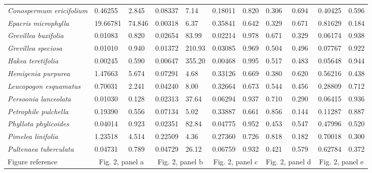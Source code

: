 \documentclass[10pt,twoside]{article}\usepackage[]{graphicx}\usepackage[]{color}
\begin{document}
\begin{table}[h]
{\begin{tabular}{p{3cm}|p{1cm}p{1cm}|p{1cm}p{1cm}|p{1cm}p{1cm}|p{1cm}p{1cm}|p{1.5cm}p{1cm}}
  \textit{Conospermum ericifolium} &  0.46255 &  2.845 & 0.08337 &   7.14 & 0.18011 & 0.820 & 0.306 & 0.694 & 0.40425 & 0.596 \\ 
  \textit{Epacris microphylla} & 19.66781 & 74.846 & 0.00318 &   6.37 & 0.35841 & 0.642 & 0.329 & 0.671 & 0.81629 & 0.184 \\ 
  \textit{Grevillea buxifolia} &  0.01083 &  0.820 & 0.02654 &  83.99 & 0.02214 & 0.978 & 0.671 & 0.329 & 0.06174 & 0.938 \\ 
  \textit{Grevillea speciosa} &  0.01010 &  0.940 & 0.01372 & 210.93 & 0.03085 & 0.969 & 0.504 & 0.496 & 0.07767 & 0.922 \\ 
  \textit{Hakea teretifolia} &  0.00245 &  0.590 & 0.00647 & 355.20 & 0.00468 & 0.995 & 0.517 & 0.483 & 0.05648 & 0.944 \\ 
  \textit{Hemigenia purpurea} &  1.47663 &  5.674 & 0.07291 &   4.68 & 0.33126 & 0.669 & 0.380 & 0.620 & 0.56216 & 0.438 \\ 
  \textit{Leucopogon esquamatus} &  0.70031 &  2.241 & 0.04240 &   8.00 & 0.32664 & 0.673 & 0.544 & 0.456 & 0.28809 & 0.712 \\ 
  \textit{Persoonia lanceolata} &  0.01030 &  0.128 & 0.02313 &  37.64 & 0.06294 & 0.937 & 0.710 & 0.290 & 0.06415 & 0.936 \\ 
  \textit{Petrophile pulchella} &  0.19390 &  0.556 & 0.07134 &   5.02 & 0.33887 & 0.661 & 0.856 & 0.144 & 0.11287 & 0.887 \\ 
  \textit{Phyllota phylicoides} &  0.04014 &  0.923 & 0.02351 &  82.84 & 0.04775 & 0.952 & 0.453 & 0.547 & 0.47996 & 0.520 \\ 
  \textit{Pimelea linifolia} &  1.23518 &  4.514 & 0.22509 &   4.36 & 0.27360 & 0.726 & 0.818 & 0.182 & 0.70018 & 0.300 \\ 
  \textit{Pultenaea tuberculata} &  0.04731 &  0.789 & 0.04729 &  26.12 & 0.06759 & 0.932 & 0.421 & 0.579 & 0.62784 & 0.372 \\ 
   \hline
Figure reference & \multicolumn{2}{c|}{Fig. 2, panel a} & \multicolumn{2}{c|}{Fig. 2, panel b} & \multicolumn{2}{c|}{Fig. 2, panel c} & \multicolumn{2}{c|}{Fig. 2, panel d}  & \multicolumn{2}{c}{Fig. 2, panel e}\\
\hline
\end{tabular}
}
\end{table}

\clearpage
\end{document}
